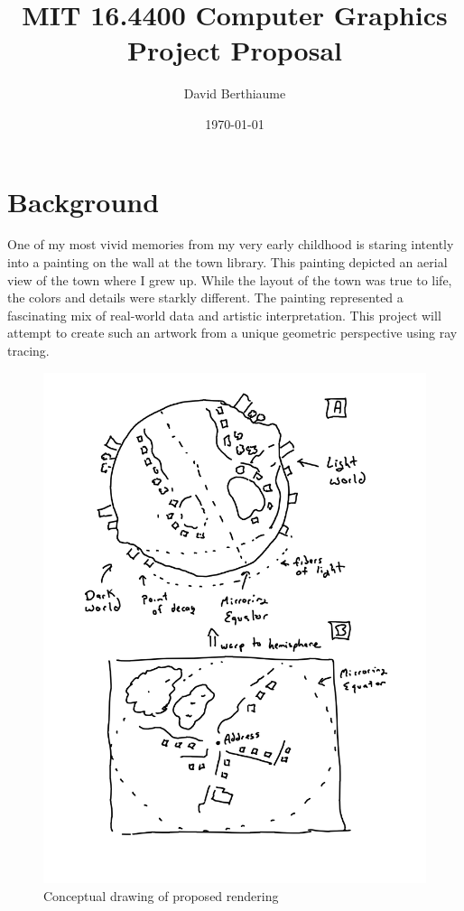 \documentclass{article}
\title{MIT 16.4400 Computer Graphics Project Proposal}
\author{David Berthiaume}
\date{\today}
\begin{document}
\maketitle
\tableofcontents

\section{Background}
One of my most vivid memories from my very early childhood is staring intently into a painting on the wall at the town library. This painting depicted
an aerial view of the town where I grew up. While the layout of the town was true to life, the colors
and details were starkly different. The painting represented a fascinating mix of real-world data and artistic interpretation. This project will attempt to create such an artwork from a unique geometric perspective using ray tracing.

\begin{figure}[H]
      \caption{Conceptual drawing of proposed rendering}
      \label{fig:con}
      \begin{center}
            \includegraphics[width=4.5in]{conceptual_drawing.png}
      \end{center}
\end{figure}
\end{document}
